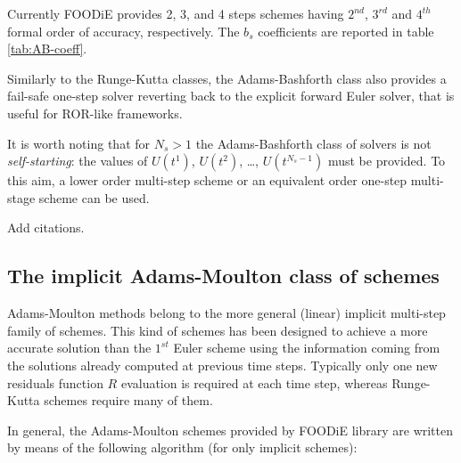 \documentclass[pdftex,preprint,3p,times,numbers]{elsarticle}
\begin{document}
Currently FOODiE provides 2, 3, and 4 steps schemes having $2^{nd}$, $3^{rd}$ and $4^{th}$ formal order of accuracy, respectively. The $b_s$ coefficients are reported in table \ref{tab:AB-coeff}.

\begin{table}[!ht]
  \centering
  \caption{Explicit Adams-Bashforth coefficients\label{tab:AB-coeff}}
\end{table}

Similarly to the Runge-Kutta classes, the Adams-Bashforth class also provides a fail-safe one-step solver reverting back to the explicit forward Euler solver, that is useful for ROR-like frameworks.

It is worth noting that for $N_s>1$ the Adams-Bashforth class of solvers is not \emph{self-starting}: the values of $U\left(t^{1}\right)$, $U\left(t^{2}\right)$, \dots, $U\left(t^{N_s-1}\right)$ must be provided. To this aim, a lower order multi-step scheme or an equivalent order one-step multi-stage scheme can be used.

{\color{red} Add citations.}

\subsection{The implicit Adams-Moulton class of schemes}

Adams-Moulton methods belong to the more general (linear) implicit multi-step family of schemes. This kind of schemes has been designed to achieve a more accurate solution than the $1^{st}$ Euler scheme using the information coming from the solutions already computed at previous time steps. Typically only one new residuals function $R$ evaluation is required at each time step, whereas Runge-Kutta schemes require many of them.

In general, the Adams-Moulton schemes provided by FOODiE library are written by means of the following algorithm (for only implicit schemes):
\end{document}
